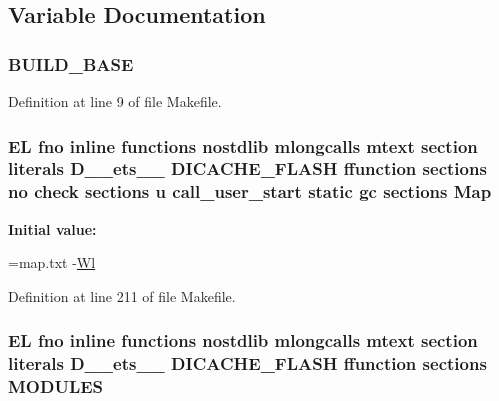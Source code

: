 \subsection{Variable Documentation}
\hypertarget{Makefile_aaa9bbf75d7f8fc94a5c7dd9504b7a178}{
\subsubsection[{B\-U\-I\-L\-D\-\_\-\-B\-A\-S\-E}]{\setlength{\rightskip}{0pt plus 5cm}B\-U\-I\-L\-D\-\_\-\-B\-A\-S\-E}}\label{Makefile_aaa9bbf75d7f8fc94a5c7dd9504b7a178}


Definition at line 9 of file Makefile.

\hypertarget{Makefile_a3f923b64cf6726ab0bfdd17b9aff0a96}{
\subsubsection[{Map}]{\setlength{\rightskip}{0pt plus 5cm}E\-L fno inline functions nostdlib mlongcalls mtext section literals D\-\_\-\-\_\-ets\-\_\-\-\_\- D\-I\-C\-A\-C\-H\-E\-\_\-\-F\-L\-A\-S\-H ffunction sections no check sections u call\-\_\-user\-\_\-start static gc sections Map\hspace{0.3cm}{\ttfamily [static]}}}\label{Makefile_a3f923b64cf6726ab0bfdd17b9aff0a96}
{\bfseries Initial value\-:}
\begin{DoxyCode}
=map.txt  
-\hyperlink{Makefile_afb1782b240d70229ae5bc6b111f9794a}{Wl}
\end{DoxyCode}


Definition at line 211 of file Makefile.

\hypertarget{Makefile_af8b8a61c029c5ab0a5518b7f5421c6ac}{
\subsubsection[{M\-O\-D\-U\-L\-E\-S}]{\setlength{\rightskip}{0pt plus 5cm}E\-L fno inline functions nostdlib mlongcalls mtext section literals D\-\_\-\-\_\-ets\-\_\-\-\_\- D\-I\-C\-A\-C\-H\-E\-\_\-\-F\-L\-A\-S\-H ffunction sections M\-O\-D\-U\-L\-E\-S}}\label{Makefile_af8b8a61c029c5ab0a5518b7f5421c6ac}



